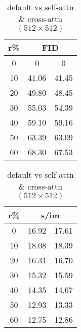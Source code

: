 \begin{table}[htp]
\caption{default vs self-attn \& cross-attn $(512 \times 512)$}
    \begin{minipage}{0.48\textwidth}
        \centering
        \begin{tabular}{|c||c|c|}
            \hline
            \multicolumn{1}{|c||}{r\%} & \multicolumn{2}{c|}{FID}\\
            \hline
            0 & 0 & 0 \\
            10 & 41.06 & 41.45 \\
            20 & 49.80 & 48.45 \\
            30 & 55.03 & 54.39 \\
            40 & 59.10 & 59.16 \\
            50 & 63.39 & 63.09 \\
            60 & 68.30 & 67.53 \\
            \hline
        \end{tabular}
    \end{minipage}
    \hfill
    \begin{minipage}{0.48\textwidth}
        \centering
        \begin{tabular}{|c||c|c|}
            \hline
            \multicolumn{1}{|c||}{r\%} & \multicolumn{2}{c|}{s/im}\\
            \hline
            0 & 16.92 & 17.61 \\
            10 & 18.08 & 18.39 \\
            20 & 16.31 & 16.70 \\
            30 & 15.32 & 15.59 \\
            40 & 14.35 & 14.67 \\
            50 & 12.93 & 13.33 \\
            60 & 12.75 & 12.86 \\
            \hline
        \end{tabular}
    \end{minipage}
\end{table}